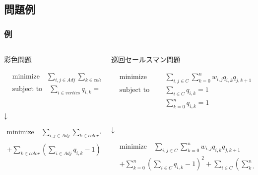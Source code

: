 \subsection{問題例}
\begin{frame}
  \frametitle{例}
    \begin{columns}[T]
      \begin{column}{0.47\textwidth}
        {\large 彩色問題}
        \footnotesize{
        \[
          \begin{aligned}
              &\text{minimize} \quad \sum_{i,j\in Adj}\sum_{k\in color}q_{i,k}q_{j,k} \\
              &\text{subject to} \quad \sum_{i\in vertics}q_{i,k} = 1 
          \end{aligned}
        \]\\
        \begin{center}
          ${\large \downarrow}$
        \end{center}
        \begin{tcolorbox}[top=0mm, left=0mm, right=0mm, bottom=0mm]
        \[
          \begin{aligned}
              \text{minimize} \quad \sum_{i,j\in Adj}\sum_{k\in color}q_{i,k}q_{j,k}\\
               + \sum_{k\in color}(\sum_{i\in Adj}q_{i,k}-1)^2\\
          \end{aligned}
        \]  
        \end{tcolorbox}
        }
      \end{column}  

      \begin{column}{0.55\textwidth}
        {\large 巡回セールスマン問題}
        \footnotesize{
        \[
          \begin{aligned}
              &\text{minimize} \quad  & & \sum_{i,j\in C}\sum_{k = 0}^n w_{i,j}q_{i,k}q_{j,k+1} \\
              &\text{subject to} \quad& & \sum_{i\in C}q_{i,k} = 1 \\
              &                       & & \sum_{k = 0}^n q_{i,k} = 1
          \end{aligned}
        \]\\
        \begin{center}
          ${\large \downarrow}$
        \end{center}
        \begin{tcolorbox}[top=0mm, left=1mm, right=0mm, bottom=0mm]
        \[
          \begin{aligned}
              &\text{minimize} \quad \sum_{i,j\in C}\sum_{k = 0}^n w_{i,j}q_{i,k}q_{j,k+1}\\
               &+ \sum_{k=0}^n(\sum_{i\in C}q_{i,k}-1)^2+\sum_{i\in C}(\sum_{k=0}^nq_{i,k}-1)^2\\
          \end{aligned}
        \]  
        \end{tcolorbox}
        }
      \end{column}  
    \end{columns}
\end{frame}

